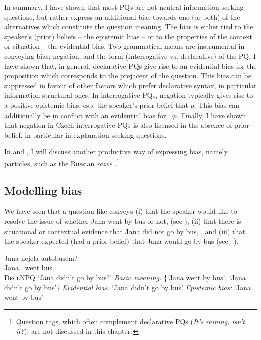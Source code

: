 \documentclass[output=paper,colorlinks,citecolor=brown]{langscibook}
\begin{document}
\noindent In summary, I have shown that most PQs are not neutral information-seeking questions, but rather express an additional bias towards one (or both) of the alternatives which constitute the question meaning. The bias is either tied to the speaker's (prior) beliefs -- the epistemic bias -- or to the properties of the context or situation -- the evidential bias. Two grammatical means are instrumental in conveying bias: negation, and the form (interrogative vs. declarative) of the PQ. I have shown that, in general, declarative PQs give rise to an evidential bias for the proposition which corresponds to the prejacent of the question. This bias can be suppressed in favour of other factors which prefer declarative syntax, in particular information-structural ones. In interrogative PQs, negation typically gives rise to a positive epistemic bias, esp. the speaker's prior belief that $p$. This bias can additionally be in conflict with an evidential bias for $\neg p$. Finally, I have shown that negation in Czech interrogative PQs is also licensed in the absence of prior belief, in particular in explanation-seeking questions.

In  and , I will discuss another productive way of expressing bias, namely particles, such as the Russian \textit{razve} \citep{Korotkova2023,Repp.Geist2025}.\footnote{Question tags, which often complement declarative PQs (\textit{It's raining, isn't it?}), are not discussed in this chapter.}

\subsection{Modelling bias}\label{sim:sec:modelling-bias}

We have seen that a question like  conveys (i) that the speaker would like to resolve the issue of whether Jana went by bus or not,  (see ), (ii) that there is situational or contextual evidence that Jana did not go by bus, , and (iii) that the speaker expected (had a prior belief) that Jana would go by bus  (see --).

\ea\gll Jana nejela autobusem?\label{sim:ex:jana}\\
Jana.{\NOM} {\NEG}.went bus.{\INS}\\\hfill\textsc{DeclNPQ}
\glt `Jana didn't go by bus?'
\ea \textit{Basic meaning:} \{`Jana went by bus', `Jana didn't go by bus'\}\label{sim:ex:jana-a}
\ex \textit{Evidential bias:} `Jana didn't go by bus'\label{sim:ex:jana-b}
\ex \textit{Epistemic bias:} `Jana went by bus'\label{sim:ex:jana-c}
\z\z
\end{document}
